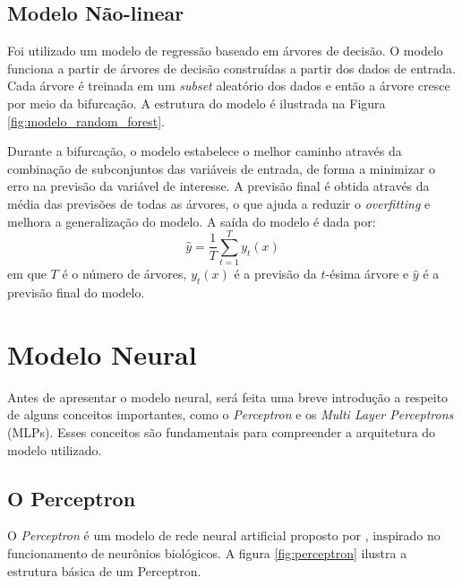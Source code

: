 \subsection{Modelo Não-linear}
Foi utilizado um modelo de regressão baseado em árvores de decisão. O modelo funciona a partir de árvores de decisão construídas 
a partir dos dados de entrada. Cada árvore é treinada em um \textit{subset} aleatório dos dados e então a árvore cresce por meio 
da bifurcação. A estrutura do modelo é ilustrada na Figura \ref{fig:modelo_random_forest}.

\begin{figure}[!ht]
	{}
	{}
\end{figure}
Durante a bifurcação, o modelo estabelece o melhor caminho através da combinação de subconjuntos das variáveis de entrada, 
de forma a minimizar o erro na previsão da variável de interesse. A previsão final é obtida através da média das previsões 
de todas as árvores, o que ajuda a reduzir o \textit{overfitting} e melhora a generalização do modelo. A saída do modelo
é dada por:
\begin{equation}
\label{eq:regressao_random_forest}
\hat{y} = \frac{1}{T} \sum_{t=1}^{T} y_t(x)
\end{equation}
em que $T$ é o número de árvores, $y_t(x)$ é a previsão da $t$-ésima árvore e $\hat{y}$ é a previsão final do modelo.


\newpage
\section{Modelo Neural}
Antes de apresentar o modelo neural, será feita uma breve introdução a respeito de alguns conceitos importantes,
como o \textit{Perceptron} e os \textit{Multi Layer Perceptrons} (MLPs). Esses conceitos são fundamentais para compreender
a arquitetura do modelo utilizado.
                  
\subsection{O Perceptron}
O \textit{Perceptron} é um modelo de rede neural artificial proposto por , inspirado no
funcionamento de neurônios biológicos. A figura \ref{fig:perceptron} ilustra a estrutura básica de um Perceptron.

